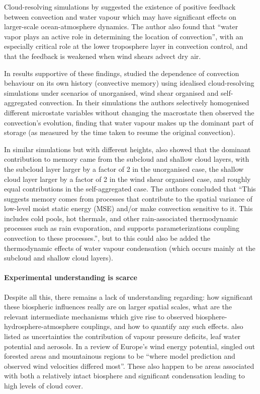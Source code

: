 Cloud-resolving simulations by \citet{tompkins2001_org, tompkins2001_rel} suggested the existence of positive feedback between convection and water vapour which may have significant effects on larger-scale ocean-atmosphere dynamics. The author also found that “water vapor plays an active role in determining the location of convection”, with an especially critical role at the lower troposphere layer in convection control, and that the feedback is weakened when wind shears advect dry air.

In results supportive of these findings, \citet{colin2019} studied the dependence of convection behaviour on its own history (convective memory) using idealised cloud-resolving simulations under scenarios of unorganised, wind shear organised and self-aggregated convection. In their simulations the authors selectively homogenised different microstate variables without changing the macrostate then observed the convection’s evolution, finding that water vapour makes up the dominant part of storage (as measured by the time taken to resume the original convection).

In similar simulations but with different heights, \citet{colin2019} also showed that the dominant contribution to memory came from the subcloud and shallow cloud layers, with the subcloud layer larger by a factor of 2 in the unorganised case, the shallow cloud layer larger by a factor of 2 in the wind shear organised case, and roughly equal contributions in the self-aggregated case. The authors concluded that “This suggests memory comes from processes that contribute to the spatial variance of low-level moist static energy (MSE) and/or make convection sensitive to it. This includes cold pools, hot thermals, and other rain-associated thermodynamic processes such as rain evaporation, and supports parameterizations coupling convection to these processes.”, but to this could also be added the thermodynamic effects of water vapour condensation (which occurs mainly at the subcloud and shallow cloud layers).

\paragraph{Experimental understanding is scarce}

Despite all this, there remains a lack of understanding regarding: how significant these biospheric influences really are on larger spatial scales, what are the relevant intermediate mechanisms which give rise to observed biosphere-hydrosphere-atmosphere couplings, and how to quantify any such effects. \citet{li2020} also listed as uncertainties the contribution of vapour pressure deficits, leaf water potential and aerosols. In a review of Europe’s wind energy potential, \citet{eea2009} singled out forested areas and mountainous regions to be “where model prediction and observed wind velocities differed most”. These also happen to be areas associated with both a relatively intact biosphere and significant condensation leading to high levels of cloud cover.

